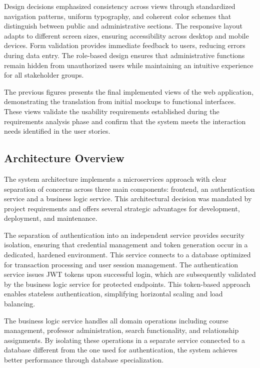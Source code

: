 \documentclass[12pt,a4paper]{article}
\begin{document}
Design decisions emphasized consistency across views through standardized navigation patterns, uniform typography, and coherent color schemes that distinguish between public and administrative sections. The responsive layout adapts to different screen sizes, ensuring accessibility across desktop and mobile devices. Form validation provides immediate feedback to users, reducing errors during data entry. The role-based design ensures that administrative functions remain hidden from unauthorized users while maintaining an intuitive experience for all stakeholder groups.\newline

The previous figures presents the final implemented views of the web application, demonstrating the translation from initial mockups to functional interfaces. These views validate the usability requirements established during the requirements analysis phase and confirm that the system meets the interaction needs identified in the user stories.

\subsection{Architecture Overview}
The system architecture implements a microservices approach with clear separation of concerns across three main components: frontend, an authentication service and a business logic service. This architectural decision was mandated by project requirements and offers several strategic advantages for development, deployment, and maintenance.\newline

The separation of authentication into an independent service provides security isolation, ensuring that credential management and token generation occur in a dedicated, hardened environment. This service connects to a database optimized for transaction processing and user session management. The authentication service issues JWT tokens upon successful login, which are subsequently validated by the business logic service for protected endpoints. This token-based approach enables stateless authentication, simplifying horizontal scaling and load balancing.\newline

The business logic service handles all domain operations including course management, professor administration, search functionality, and relationship assignments. By isolating these operations in a separate service connected to a database different from the one used for authentication, the system achieves better performance through database specialization.\newline
\end{document}
